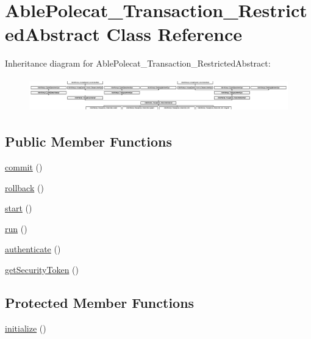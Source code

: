 \hypertarget{class_able_polecat___transaction___restricted_abstract}{}\section{Able\+Polecat\+\_\+\+Transaction\+\_\+\+Restricted\+Abstract Class Reference}
\label{class_able_polecat___transaction___restricted_abstract}
Inheritance diagram for Able\+Polecat\+\_\+\+Transaction\+\_\+\+Restricted\+Abstract\+:\begin{figure}[H]
\begin{center}
\leavevmode
\includegraphics[height=1.463415cm]{class_able_polecat___transaction___restricted_abstract}
\end{center}
\end{figure}
\subsection*{Public Member Functions}
\begin{DoxyCompactItemize}
\item 
\hyperlink{class_able_polecat___transaction___restricted_abstract_af5674c27d4a92f6228565010eacbb9cb}{commit} ()
\item 
\hyperlink{class_able_polecat___transaction___restricted_abstract_afa549adf79e3f8c09fe8f903dd5fbfa7}{rollback} ()
\item 
\hyperlink{class_able_polecat___transaction___restricted_abstract_af8fa59992209e36dccb3eefb0f75531f}{start} ()
\item 
\hyperlink{class_able_polecat___transaction___restricted_abstract_afb0fafe7e02a3ae1993c01c19fad2bae}{run} ()
\item 
\hyperlink{class_able_polecat___transaction___restricted_abstract_a750c93a7dfab5314f2bf662a407bc5a6}{authenticate} ()
\item 
\hyperlink{class_able_polecat___transaction___restricted_abstract_a09f538e74290cdbdffddfcfb5b379499}{get\+Security\+Token} ()
\end{DoxyCompactItemize}
\subsection*{Protected Member Functions}
\begin{DoxyCompactItemize}
\item 
\hyperlink{class_able_polecat___transaction___restricted_abstract_a91098fa7d1917ce4833f284bbef12627}{initialize} ()
\end{DoxyCompactItemize}
